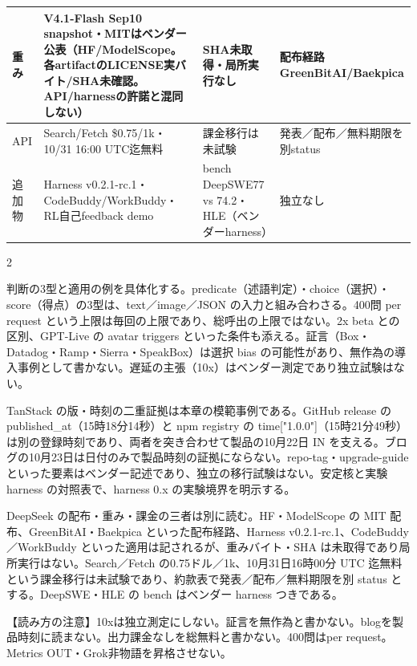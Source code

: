\documentclass[lualatex,a4paper,10pt]{jlreq}
\begin{document}
{\centering\footnotesize
{}
\begin{tabularx}{0.96\linewidth}{@{}lXXX@{}}
\toprule
重み & V4.1-Flash Sep10 snapshot・MITはベンダー公表（HF/ModelScope。各artifactのLICENSE実バイト/SHA未確認。API/harnessの許諾と混同しない） & SHA未取得・局所実行なし & 配布経路GreenBitAI/Baekpica \\
\midrule
API & Search/Fetch \$0.75/1k・10/31 16:00 UTC迄無料 & 課金移行は未試験 & 発表／配布／無料期限を別status \\
追加物 & Harness v0.2.1-rc.1・CodeBuddy/WorkBuddy・RL自己feedback demo & bench DeepSWE77 vs 74.2・HLE（ベンダーharness） & 独立なし \\
\bottomrule
\end{tabularx}
} %
\begin{multicols}{2} %


判断の3型と適用の例を具体化する。predicate（述語判定）・choice（選択）・score（得点）の3型は、text／image／JSON の入力と組み合わさる。400問 per request という上限は毎回の上限であり、総呼出の上限ではない。2x beta との区別、GPT-Live の avatar triggers といった条件も添える。証言（Box・Datadog・Ramp・Sierra・SpeakBox）は選択 bias の可能性があり、無作為の導入事例として書かない。遅延の主張（10x）はベンダー測定であり独立試験はない。


TanStack の版・時刻の二重証拠は本章の模範事例である。GitHub release の published\_at（15時18分14秒）と npm registry の time["1.0.0"]（15時21分49秒）は別の登録時刻であり、両者を突き合わせて製品の10月22日 IN を支える。ブログの10月23日は日付のみで製品時刻の証拠にならない。repo-tag・upgrade-guide といった要素はベンダー記述であり、独立の移行試験はない。安定核と実験 harness の対照表で、harness 0.x の実験境界を明示する。


DeepSeek の配布・重み・課金の三者は別に読む。HF・ModelScope の MIT 配布、GreenBitAI・Baekpica といった配布経路、Harness v0.2.1-rc.1、CodeBuddy／WorkBuddy といった適用は記されるが、重みバイト・SHA は未取得であり局所実行はない。Search／Fetch の0.75ドル／1k、10月31日16時00分 UTC 迄無料という課金移行は未試験であり、約款表で発表／配布／無料期限を別 status とする。DeepSWE・HLE の bench はベンダー harness つきである。


\begin{tcolorbox}[colback=SurveySoft,colframe=SurveyRule,arc=1mm,boxrule=0.4pt,left=2mm,right=2mm]
【読み方の注意】10xは独立測定にしない。証言を無作為と書かない。blogを製品時刻に読まない。出力課金なしを総無料と書かない。400問はper request。Metrics OUT・Grok非物語を昇格させない。

\end{tcolorbox}


\end{multicols} %
\end{document}
